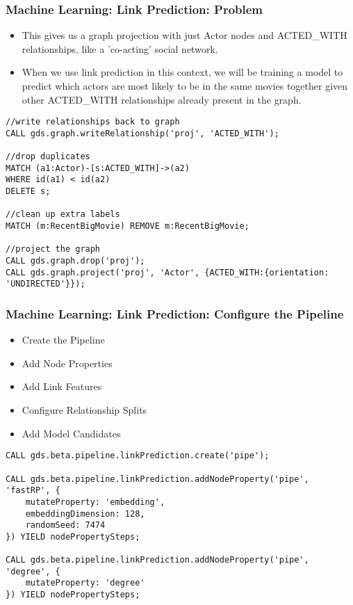 \begin{frame}[fragile]\frametitle{Machine Learning: Link Prediction: Problem}

\begin{itemize}
\item This gives us a graph projection with just Actor nodes and ACTED\_WITH relationships, like a 'co-acting' social network. 
\item When we use link prediction in this context, we will be training a model to predict which actors are most likely to be in the same movies together given other ACTED\_WITH relationships already present in the graph. 
\end{itemize}

\begin{lstlisting}
//write relationships back to graph
CALL gds.graph.writeRelationship('proj', 'ACTED_WITH');

//drop duplicates
MATCH (a1:Actor)-[s:ACTED_WITH]->(a2)
WHERE id(a1) < id(a2)
DELETE s;

//clean up extra labels
MATCH (m:RecentBigMovie) REMOVE m:RecentBigMovie;

//project the graph
CALL gds.graph.drop('proj');
CALL gds.graph.project('proj', 'Actor', {ACTED_WITH:{orientation: 'UNDIRECTED'}});
\end{lstlisting}

\end{frame}

\begin{frame}[fragile]\frametitle{Machine Learning: Link Prediction: Configure the Pipeline}

\begin{itemize}
\item Create the Pipeline
\item Add Node Properties
\item Add Link Features
\item Configure Relationship Splits
\item Add Model Candidates
\end{itemize}

\begin{lstlisting}
CALL gds.beta.pipeline.linkPrediction.create('pipe');

CALL gds.beta.pipeline.linkPrediction.addNodeProperty('pipe', 'fastRP', {
    mutateProperty: 'embedding',
    embeddingDimension: 128,
    randomSeed: 7474
}) YIELD nodePropertySteps;

CALL gds.beta.pipeline.linkPrediction.addNodeProperty('pipe', 'degree', {
    mutateProperty: 'degree'
}) YIELD nodePropertySteps;
\end{lstlisting}

\end{frame}

